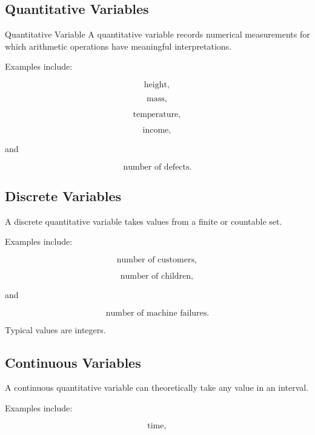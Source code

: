 \subsection{Quantitative Variables}
\label{subsec:quantitative-variables}

\begin{definitionbox}{Quantitative Variable}
A quantitative variable records numerical measurements for which
arithmetic operations have meaningful interpretations.
\end{definitionbox}

Examples include:

\[
\text{height},
\]

\[
\text{mass},
\]

\[
\text{temperature},
\]

\[
\text{income},
\]

and

\[
\text{number of defects}.
\]

\subsection{Discrete Variables}
\label{subsec:discrete-variables-statistics}

A discrete quantitative variable takes values from a finite or countable
set.

Examples include:

\[
\text{number of customers},
\]

\[
\text{number of children},
\]

and

\[
\text{number of machine failures}.
\]

Typical values are integers.

\subsection{Continuous Variables}
\label{subsec:continuous-variables-statistics}

A continuous quantitative variable can theoretically take any value in
an interval.

Examples include:

\[
\text{time},
\]

